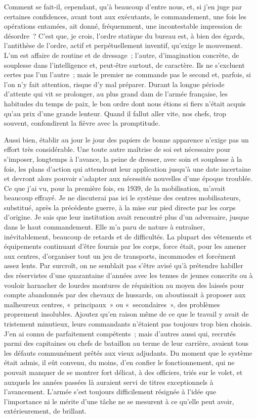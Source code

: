 \documentclass[french,twoside]{book} %
\begin{document}
Comment se fait-il, cependant, qu’à beaucoup d’entre nous, et, si j’en juge par certaines confidences, avant tout aux exécutants, le commandement, une fois les opérations entamées, ait donné, fréquemment, une incontestable impression de désordre ? C’est que, je crois, l’ordre statique du bureau est, à bien des égards, l’antithèse de l’ordre, actif et perpétuellement inventif, qu’exige le mouvement. L’un est affaire de routine et de dressage ; l’autre, d’imagination concrète, de souplesse dans l’intelligence et, peut-être surtout, de caractère. Ils ne s’excluent certes pas l’un l’autre ; mais le premier ne commande pas le second et, parfois, si l’on n’y fait attention, risque d’y mal préparer. Durant la longue période d’attente qui vit se prolonger, au plus grand dam de l’armée française, les habitudes du temps de paix, le bon ordre dont nous étions si fiers n’était acquis qu’au prix d’une grande lenteur. Quand il fallut aller vite, nos chefs, trop souvent, confondirent la fièvre avec la promptitude.\par
  Aussi bien, établir au jour le jour des papiers de bonne apparence n’exige pas un effort très considérable. Une toute autre maîtrise de soi est nécessaire pour s’imposer, longtemps à l’avance, la peine de dresser, avec soin et souplesse à la fois, les plans d’action qui attendront leur application jusqu’à une date incertaine et devront alors pouvoir s’adapter aux nécessités nouvelles d’une époque troublée. Ce que j’ai vu, pour la première fois, en 1939, de la mobilisation, m’avait beaucoup effrayé. Je ne discuterai pas ici le système des centres mobilisateurs, substitué, après la précédente guerre, à la mise sur pied directe par les corps d’origine. Je sais que leur institution avait rencontré plus d’un adversaire, jusque dans le haut commandement. Elle m’a paru de nature à entraîner, inévitablement, beaucoup de retards et de difficultés. La plupart des vêtements et équipements continuant d’être fournis par les corps, force était, pour les amener aux centres, d’organiser tout un jeu de transports, incommodes et forcément assez lents. Par surcroît, on ne semblait pas s’être avisé qu’à prétendre habiller des réservistes d’une quarantaine d’années avec les tenues de jeunes conscrits ou à vouloir harnacher de lourdes montures de réquisition au moyen des laissés pour compte abandonnés par des chevaux de hussards, on aboutissait à proposer aux malheureux centres, « principaux » ou « secondaires », des problèmes proprement insolubles. Ajoutez qu’en raison même de ce que le travail y avait de tristement minutieux, leurs commandants n’étaient pas toujours trop bien choisis. J’en ai connu de parfaitement compétents ; mais d’autres aussi qui, recrutés parmi des capitaines ou chefs de bataillon au terme de leur carrière, avaient tous les défauts communément prêtés aux vieux adjudants. Du moment que le système était admis, il eût convenu, du moins, d’en confier le fonctionnement, qui ne pouvait manquer de se montrer fort délicat, à des officiers, triés sur le volet, et auxquels   les années passées là auraient servi de titres exceptionnels à l’avancement. L’armée s’est toujours difficilement résignée à l’idée que l’importance ni le mérite d’une tâche ne se mesurent à ce qu’elle peut avoir, extérieurement, de brillant.\par
\end{document}
